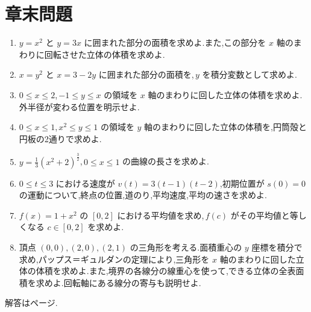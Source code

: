 \section*{章末問題}
\begin{enumerate}[label=\textbf{\thechapter.\arabic*},leftmargin=*]
\item\label{問:面積と円環}
$y=x^2$ と $y=3x$ に囲まれた部分の面積を求めよ.また,この部分を $x$ 軸のまわりに回転させた立体の体積を求めよ.
\item\label{問:横帯の面積}
$x=y^2$ と $x=3-2y$ に囲まれた部分の面積を,\,$y$ を積分変数として求めよ.
\item\label{問:外半径の交代}
$0\le x\le2$,\,$-1\le y\le x$ の領域を $x$ 軸のまわりに回した立体の体積を求めよ.外半径が変わる位置を明示せよ.
\item\label{問:円筒と円板}
$0\le x\le1$,\,$x^2\le y\le1$ の領域を $y$ 軸のまわりに回した立体の体積を,円筒殻と円板の2通りで求めよ.
\item\label{問:弧長の平方完成}
$y=\frac13(x^2+2)^{\frac32}$,\,$0\le x\le1$ の曲線の長さを求めよ.
\item\label{問:道のりと平均速度}
$0\le t\le3$ における速度が $v(t)=3(t-1)(t-2)$,初期位置が $s(0)=0$ の運動について,終点の位置,道のり,平均速度,平均の速さを求めよ.
\item\label{問:平均値を取る点}
$f(x)=1+x^2$ の $[0,2]$ における平均値を求め,\,$f(c)$ がその平均値と等しくなる $c\in[0,2]$ を求めよ.
\item\label{問:三角形と両パップス}
頂点 $(0,0),(2,0),(2,1)$ の三角形を考える.面積重心の $y$ 座標を積分で求め,パップス＝ギュルダンの定理により,三角形を $x$ 軸のまわりに回した立体の体積を求めよ.また,境界の各線分の線重心を使って,できる立体の全表面積を求めよ.回転軸にある線分の寄与も説明せよ.
\end{enumerate}

\smallskip\noindent 解答は\pageref{解答:第9章}ページ.

